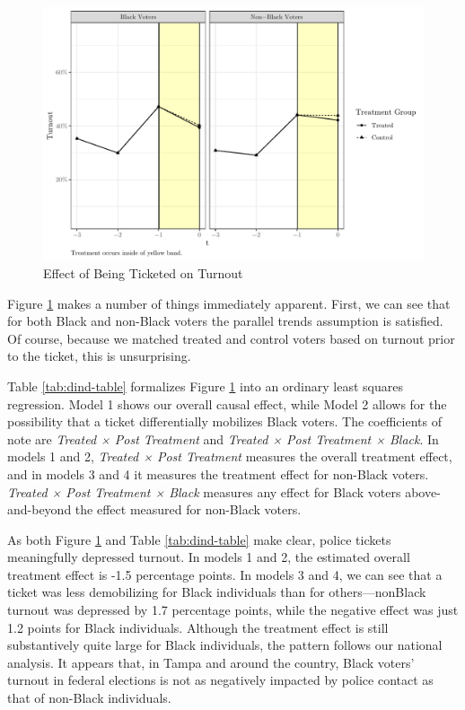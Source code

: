 \documentclass[
  12pt,
]{article}
\begin{document}
\begin{figure}[H]

{\centering \includegraphics{draft_paper_files/figure-latex/did1-1} 

}

\caption{\label{fig:did-1}Effect of Being Ticketed on Turnout}\label{fig:did1}
\end{figure}

Figure \ref{fig:did1} makes a number of things immediately apparent. First, we can see that for both Black and non-Black voters the parallel trends assumption is satisfied. Of course, because we matched treated and control voters based on turnout prior to the ticket, this is unsurprising.

Table \ref{tab:dind-table} formalizes Figure \ref{fig:did1} into an ordinary least squares regression. Model 1 shows our overall causal effect, while Model 2 allows for the possibility that a ticket differentially mobilizes Black voters. The coefficients of note are \emph{Treated × Post Treatment} and \emph{Treated × Post Treatment × Black}. In models 1 and 2, \emph{Treated × Post Treatment} measures the overall treatment effect, and in models 3 and 4 it measures the treatment effect for non-Black voters. \emph{Treated × Post Treatment × Black} measures any effect for Black voters above-and-beyond the effect measured for non-Black voters.

\begin{singlespace}

\end{singlespace}

As both Figure \ref{fig:did1} and Table \ref{tab:dind-table} make clear, police tickets meaningfully depressed turnout. In models 1 and 2, the estimated overall treatment effect is -1.5 percentage points. In models 3 and 4, we can see that a ticket was less demobilizing for Black individuals than for others---nonBlack turnout was depressed by 1.7 percentage points, while the negative effect was just 1.2 points for Black individuals. Although the treatment effect is still substantively quite large for Black individuals, the pattern follows our national analysis. It appears that, in Tampa and around the country, Black voters' turnout in federal elections is not as negatively impacted by police contact as that of non-Black individuals.
\end{document}
